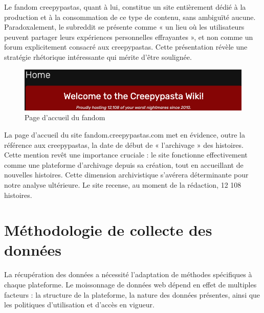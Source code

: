 \documentclass[12pt,a4paper,oneside,titlepage]{book} %
\begin{document}
Le fandom creepypastas, quant à lui, constitue un site entièrement dédié à la production et à la consommation de ce type de contenu, sans ambiguïté aucune. Paradoxalement, le subreddit se présente comme « un lieu où les utilisateurs peuvent partager leurs expériences personnelles effrayantes », et non comme un forum explicitement consacré aux creepypastas. Cette présentation révèle une stratégie rhétorique intéressante qui mérite d'être soulignée.
\begin{figure}
    \centering
    \includegraphics[width=0.5\linewidth]{illustration/accueil_fandom.png}
    \caption{Page d'accueil du fandom}
    \label{fig:acc_fandom}
\end{figure}
La page d'accueil du site fandom.creepypastas.com met en évidence, outre la référence aux creepypastas, la date de début de « l'archivage » des histoires. Cette mention revêt une importance cruciale : le site fonctionne effectivement comme une plateforme d'archivage depuis sa création, tout en accueillant de nouvelles histoires. Cette dimension archivistique s'avérera déterminante pour notre analyse ultérieure. Le site recense, au moment de la rédaction, 12 108 histoires.
\section{Méthodologie de collecte des données}

La récupération des données a nécessité l'adaptation de méthodes spécifiques à chaque plateforme. Le moissonnage de données web dépend en effet de multiples facteurs : la structure de la plateforme, la nature des données présentes, ainsi que les politiques d'utilisation et d'accès en vigueur.
\end{document}
